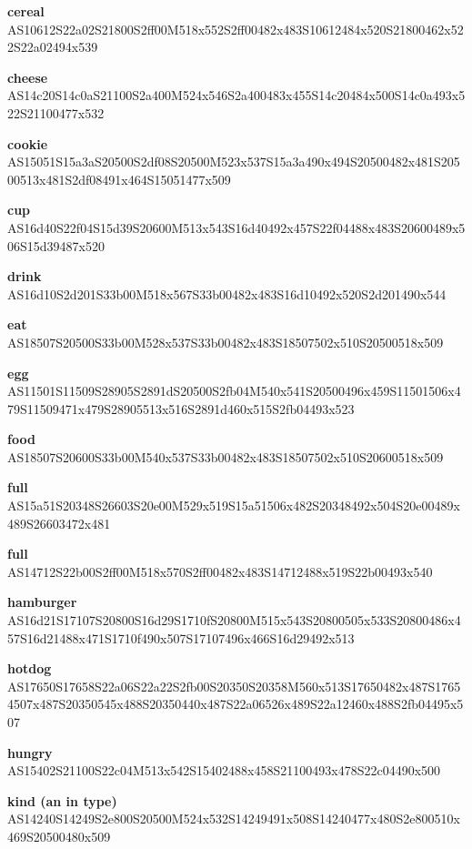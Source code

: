 \documentclass{article}
\begin{document}
\begin{glossary}
\textbf{cereal}\\
AS10612S22a02S21800S2ff00M518x552S2ff00482x483S10612484x520S21800462x522S22a02494x539

\textbf{cheese}\\
AS14c20S14c0aS21100S2a400M524x546S2a400483x455S14c20484x500S14c0a493x522S21100477x532

\textbf{cookie}\\
AS15051S15a3aS20500S2df08S20500M523x537S15a3a490x494S20500482x481S20500513x481S2df08491x464S15051477x509

\textbf{cup}\\
AS16d40S22f04S15d39S20600M513x543S16d40492x457S22f04488x483S20600489x506S15d39487x520

\textbf{drink}\\
AS16d10S2d201S33b00M518x567S33b00482x483S16d10492x520S2d201490x544

\textbf{eat}\\
AS18507S20500S33b00M528x537S33b00482x483S18507502x510S20500518x509

\textbf{egg}\\
AS11501S11509S28905S2891dS20500S2fb04M540x541S20500496x459S11501506x479S11509471x479S28905513x516S2891d460x515S2fb04493x523

\textbf{food}\\
AS18507S20600S33b00M540x537S33b00482x483S18507502x510S20600518x509

\textbf{full}\\
AS15a51S20348S26603S20e00M529x519S15a51506x482S20348492x504S20e00489x489S26603472x481

\textbf{full}\\
AS14712S22b00S2ff00M518x570S2ff00482x483S14712488x519S22b00493x540

\textbf{hamburger}\\
AS16d21S17107S20800S16d29S1710fS20800M515x543S20800505x533S20800486x457S16d21488x471S1710f490x507S17107496x466S16d29492x513

\textbf{hotdog}\\
AS17650S17658S22a06S22a22S2fb00S20350S20358M560x513S17650482x487S17654507x487S20350545x488S20350440x487S22a06526x489S22a12460x488S2fb04495x507

\textbf{hungry}\\
AS15402S21100S22c04M513x542S15402488x458S21100493x478S22c04490x500

\textbf{kind (an in type)}\\
AS14240S14249S2e800S20500M524x532S14249491x508S14240477x480S2e800510x469S20500480x509


\end{glossary}
\end{document}
